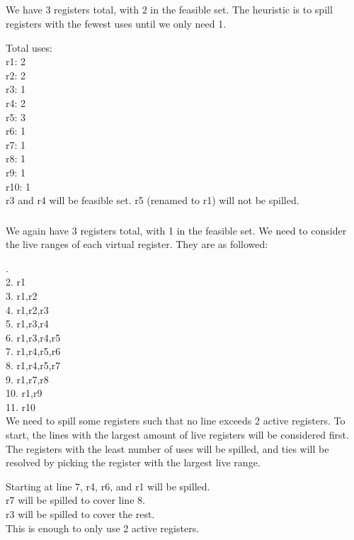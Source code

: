 \documentclass[11pt]{article}
\begin{document}
\subsection{}
\subsubsection{}
We have 3 registers total, with 2 in the feasible set.
The heuristic is to spill registers with the fewest uses until we only need 1.

\noindent Total uses:\\
r1:  2\\
r2:  2\\
r3:  1\\
r4:  2\\
r5:  3\\
r6:  1\\
r7:  1\\
r8:  1\\
r9:  1\\
r10: 1\\

\noindent r3 and r4 will be feasible set.
r5 (renamed to r1) will not be spilled.



\subsubsection{}
We again have 3 registers total, with 1 in the feasible set.
We need to consider the live ranges of each virtual register.
They are as followed:

.\\
2.  r1\\
3.  r1,r2\\
4.  r1,r2,r3\\
5.  r1,r3,r4\\
6.  r1,r3,r4,r5\\
7.  r1,r4,r5,r6\\
8.  r1,r4,r5,r7\\
9.  r1,r7,r8\\
10. r1,r9\\
11. r10\\

\noindent We need to spill some registers such that no line exceeds 2 active registers.
To start, the lines with the largest amount of live registers will be considered
first.  The registers with the least number of uses will be spilled, and ties
will be resolved by picking the register with the largest live range.

\noindent Starting at line 7, r4, r6, and r1 will be spilled.\\
r7 will be spilled to cover line 8.\\
r3 will be spilled to cover the rest.\\
This is enough to only use 2 active registers.


\end{document}
